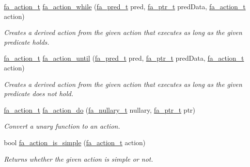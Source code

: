 \begin{DoxyCompactItemize}
\hyperlink{group___fa_action_gadb08ae063168671e5fedc6c23f20ae4b}{fa\-\_\-action\-\_\-t} \hyperlink{group___fa_action_ga672d8e5edd644f5717ad4e3c3d61c382}{fa\-\_\-action\-\_\-while} (\hyperlink{group___fa_gae6b6ae9fb073db0ba0bd323d511c6a98}{fa\-\_\-pred\-\_\-t} pred, \hyperlink{group___fa_ga915ddeae99ad7568b273d2b876425197}{fa\-\_\-ptr\-\_\-t} pred\-Data, \hyperlink{group___fa_action_gadb08ae063168671e5fedc6c23f20ae4b}{fa\-\_\-action\-\_\-t} action)
\begin{DoxyCompactList}\small\item\em Creates a derived action from the given action that executes as long as the given predicate holds. \end{DoxyCompactList}\item 
\hyperlink{group___fa_action_gadb08ae063168671e5fedc6c23f20ae4b}{fa\-\_\-action\-\_\-t} \hyperlink{group___fa_action_ga738040c72d7251a5e1548cc94e3ab1b4}{fa\-\_\-action\-\_\-until} (\hyperlink{group___fa_gae6b6ae9fb073db0ba0bd323d511c6a98}{fa\-\_\-pred\-\_\-t} pred, \hyperlink{group___fa_ga915ddeae99ad7568b273d2b876425197}{fa\-\_\-ptr\-\_\-t} pred\-Data, \hyperlink{group___fa_action_gadb08ae063168671e5fedc6c23f20ae4b}{fa\-\_\-action\-\_\-t} action)
\begin{DoxyCompactList}\small\item\em Creates a derived action from the given action that executes as long as the given predicate does {\itshape not} hold. \end{DoxyCompactList}\item 
\hyperlink{group___fa_action_gadb08ae063168671e5fedc6c23f20ae4b}{fa\-\_\-action\-\_\-t} \hyperlink{group___fa_action_ga31bc40c290b44b342599fa0e1b8e2aa4}{fa\-\_\-action\-\_\-do} (\hyperlink{group___fa_ga43b940a9294fd58a54087ef0b416e479}{fa\-\_\-nullary\-\_\-t} nullary, \hyperlink{group___fa_ga915ddeae99ad7568b273d2b876425197}{fa\-\_\-ptr\-\_\-t} ptr)
\begin{DoxyCompactList}\small\item\em Convert a unary function to an action. \end{DoxyCompactList}\item 
bool \hyperlink{group___fa_action_ga434510734518ad00130c2e3a3ff61e50}{fa\-\_\-action\-\_\-is\-\_\-simple} (\hyperlink{group___fa_action_gadb08ae063168671e5fedc6c23f20ae4b}{fa\-\_\-action\-\_\-t} action)
\begin{DoxyCompactList}\small\item\em Returns whether the given action is simple or not. \end{DoxyCompactList}\item 

\end{DoxyCompactItemize}
